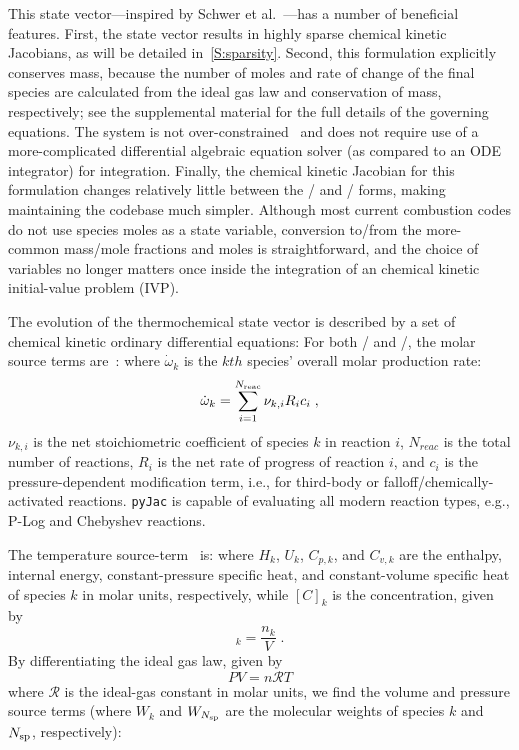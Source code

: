 \documentclass[12pt,number,sort&compress,preprint]{elsarticle}
\newcommand{\revise}[1]{{\sloppy\textcolor{RoyalPurple}{#1}}}  %
\begin{document}
This state vector---inspired by Schwer et al.~\cite{SCHWER2002270}---has a number of \revise{beneficial features}.
First, the state vector results in highly sparse chemical kinetic Jacobians, as will be detailed in~\cref{S:sparsity}.
Second, \revise{this formulation explicitly conserves mass, because the number of moles and rate of change of the final species are calculated from the ideal gas law and conservation of mass, respectively}; \revise{see the supplemental material for the full details of the governing equations}.
\revise{The system is} not over-constrained~\cite{HANSEN2018257} and does not require use of a more-complicated differential algebraic equation solver (as compared to an ODE integrator) for integration.
Finally, the chemical kinetic Jacobian \revise{for this formulation} changes relatively little between the \conp/ and \conv/ forms, making maintaining the codebase much simpler.
Although most current combustion codes do not use species moles as a state variable, conversion to\slash from the more-common mass\slash mole fractions and moles is straightforward, and \revise{the choice of variables no longer matters once inside the integration} of an chemical kinetic initial-value problem (IVP).

The evolution of the thermochemical state vector is described by a set of chemical kinetic ordinary differential equations:
For both \conp/ and \conv/, the molar source terms are~\cite{TurnsStephenR2012Aitc}:
where $\dot{\omega}_k$ is the $kth$ species' overall molar production rate:
\begin{equation}
 \dot{\omega}_{k} = \sum_{i=1}^{\nr/} \nu_{k, i} R_{i} c_{i} \;,
\end{equation}
$\nu_{k, i}$ is the net stoichiometric coefficient of species $k$ in reaction $i$, $N_{reac}$ is the total number of reactions, $R_{i}$ is the net rate of progress of reaction $i$, and $c_{i}$ is the pressure-dependent modification term, i.e., for third-body or falloff\slash chemically-activated reactions.
\texttt{pyJac} is capable of evaluating all modern reaction types, e.g., P-Log and Chebyshev reactions.

The temperature source-term~\cite{TurnsStephenR2012Aitc} is:
where $H_k$, $U_k$, $C_{p,k}$, and $C_{v, k}$ are the enthalpy, internal energy, constant-pressure specific heat, and constant-volume specific heat of species $k$ in molar units, respectively, while $[C]_{k}$ is the concentration, given by
\begin{equation}
 [C]_{k} = \frac{n_{k}}{V} \;.
\end{equation}
By differentiating the ideal gas law, given by
\begin{equation}
 PV = n\mathcal{R}T
\end{equation}
where $\mathcal{R}$ is the ideal-gas constant in molar units, \revise{we find} the volume and pressure source terms (where $W_k$ and $W_{\ns/}$ are the molecular weights of species $k$ and $\ns/$, respectively):
\end{document}
